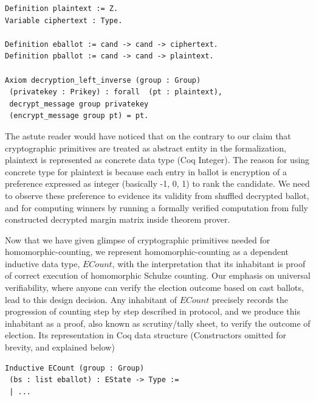 \documentclass{llncs}
\begin{document}
\begin{lstlisting}[frame=single,basicstyle=\ttfamily\footnotesize]
Definition plaintext := Z.
Variable ciphertext : Type. 

Definition eballot := cand -> cand -> ciphertext.
Definition pballot := cand -> cand -> plaintext.

Axiom decryption_left_inverse (group : Group) 
 (privatekey : Prikey) : forall  (pt : plaintext),
 decrypt_message group privatekey 
 (encrypt_message group pt) = pt.
\end{lstlisting}



%
The astute reader would have noticed that on the contrary to our claim that 
cryptographic primitives are treated as abstract entity in the 
formalization, plaintext is represented as concrete data type (Coq Integer).
The reason for using concrete type for plaintext is because each 
entry in ballot is encryption of a preference expressed as integer 
(basically -1, 0, 1) to rank the candidate. 
We need to observe these preference to evidence its validity
from shuffled decrypted ballot, 
and  for computing winners by running a formally verified computation
from fully constructed decrypted margin matrix inside theorem prover.  
 
   
Now that we have given glimpse of cryptographic primitives needed for 
homomorphic-counting, we represent homomorphic-counting  as a 
dependent inductive data type, $ECount$, with the interpretation that its 
inhabitant is proof of correct execution of homomorphic Schulze counting. 
Our emphasis on  universal verifiability, where anyone can verify 
the election outcome based 
    on cast ballots, lead to this design decision. Any inhabitant 
    of $ECount$ precisely records the progression of counting step by step 
    described in protocol, and we 
    produce this inhabitant as a proof, also known as scrutiny/tally sheet, 
    to verify the outcome of election. Its 
representation in Coq data structure (Constructors omitted for brevity, 
and explained below)
\begin{verbatim}
Inductive ECount (group : Group) 
 (bs : list eballot) : EState -> Type :=
 | ... 
\end{verbatim}
\end{document}
